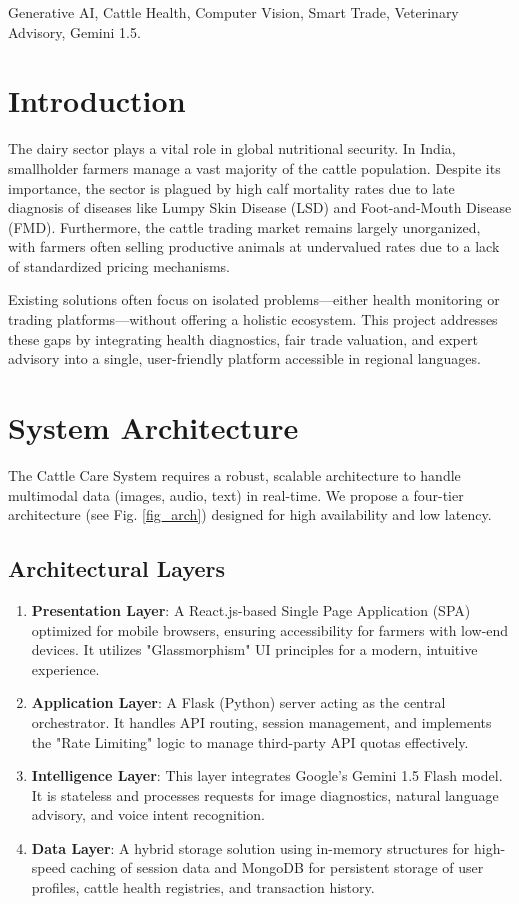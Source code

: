 \documentclass[conference]{IEEEtran}
\begin{document}
\begin{IEEEkeywords}
Generative AI, Cattle Health, Computer Vision, Smart Trade, Veterinary Advisory, Gemini 1.5.
\end{IEEEkeywords}

\section{Introduction}
The dairy sector plays a vital role in global nutritional security. In India, smallholder farmers manage a vast majority of the cattle population. Despite its importance, the sector is plagued by high calf mortality rates due to late diagnosis of diseases like Lumpy Skin Disease (LSD) and Foot-and-Mouth Disease (FMD). Furthermore, the cattle trading market remains largely unorganized, with farmers often selling productive animals at undervalued rates due to a lack of standardized pricing mechanisms.

Existing solutions often focus on isolated problems—either health monitoring or trading platforms—without offering a holistic ecosystem. This project addresses these gaps by integrating health diagnostics, fair trade valuation, and expert advisory into a single, user-friendly platform accessible in regional languages.

\section{System Architecture}
The Cattle Care System requires a robust, scalable architecture to handle multimodal data (images, audio, text) in real-time. We propose a four-tier architecture (see Fig. \ref{fig_arch}) designed for high availability and low latency.

\subsection{Architectural Layers}
\begin{enumerate}
    \item \textbf{Presentation Layer}: A React.js-based Single Page Application (SPA) optimized for mobile browsers, ensuring accessibility for farmers with low-end devices. It utilizes "Glassmorphism" UI principles for a modern, intuitive experience.
    \item \textbf{Application Layer}: A Flask (Python) server acting as the central orchestrator. It handles API routing, session management, and implements the "Rate Limiting" logic to manage third-party API quotas effectively.
    \item \textbf{Intelligence Layer}: This layer integrates Google's Gemini 1.5 Flash model. It is stateless and processes requests for image diagnostics, natural language advisory, and voice intent recognition.
    \item \textbf{Data Layer}: A hybrid storage solution using in-memory structures for high-speed caching of session data and MongoDB for persistent storage of user profiles, cattle health registries, and transaction history.
\end{enumerate}
\end{document}
